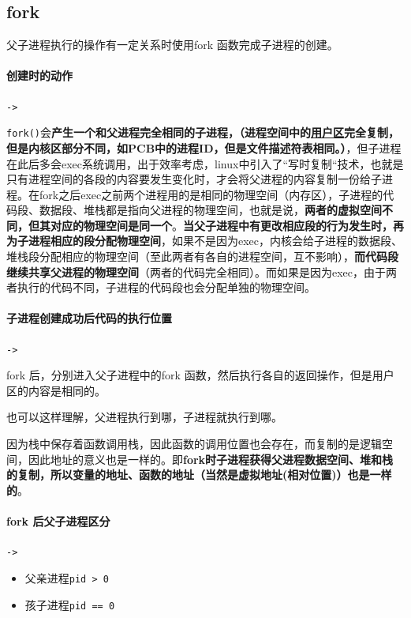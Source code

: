 \documentclass[UTF8,a4paper,12pt]{ctexbook}
\begin{document}
		\subsection{fork}
			父子进程执行的操作有一定关系时使用fork 函数完成子进程的创建。
			\paragraph{创建时的动作}\verb|->|
				
				\verb|fork()|会\textbf{产生一个和父进程完全相同的子进程，（进程空间中的\underline{用户区}完全复制，但是内核区部分不同，如PCB中的进程ID，但是文件描述符表相同。）}，但子进程在此后多会exec系统调用，出于效率考虑，linux中引入了“写时复制“技术，也就是只有进程空间的各段的内容要发生变化时，才会将父进程的内容复制一份给子进程。在fork之后exec之前两个进程用的是相同的物理空间（内存区），子进程的代码段、数据段、堆栈都是指向父进程的物理空间，也就是说，\textbf{两者的虚拟空间不同，但其对应的物理空间是同一个}。\textbf{当父子进程中有更改相应段的行为发生时，再为子进程相应的段分配物理空间}，如果不是因为exec，内核会给子进程的数据段、堆栈段分配相应的物理空间（至此两者有各自的进程空间，互不影响），\textbf{而代码段继续共享父进程的物理空间}（两者的代码完全相同）。而如果是因为exec，由于两者执行的代码不同，子进程的代码段也会分配单独的物理空间。
			
			\paragraph{子进程创建成功后代码的执行位置}\verb|->|
			
				fork 后，分别进入父子进程中的fork 函数，然后执行各自的返回操作，但是用户区的内容是相同的。
				
				也可以这样理解，父进程执行到哪，子进程就执行到哪。
				
				因为栈中保存着函数调用栈，因此函数的调用位置也会存在，而复制的是逻辑空间，因此地址的意义也是一样的。即\textbf{fork时子进程获得父进程数据空间、堆和栈的复制，所以变量的地址、函数的地址（当然是虚拟地址(相对位置)）也是一样的}。
			
			
			\paragraph{fork 后父子进程区分}\verb|->|
				\begin{itemize}
					\item 父亲进程\verb|pid > 0|
					\item 孩子进程\verb|pid == 0|
				\end{itemize}
				
\end{document}
